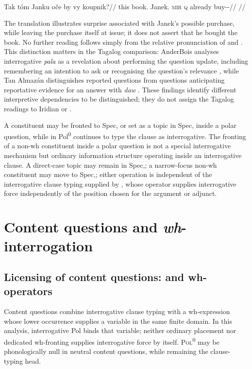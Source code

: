 \pex
\a
\begingl
\gla Tak tóm Janku oče by vy koupnik?//
\glb this book.\Dir{} Janek.\Trs{} \textsc{mir} \textsc{q} already buy-\Trs{}-\Pf{}//
\glft {}//
\endgl
\xe

The translation illustrates surprise associated with Janek's possible
purchase, while leaving the purchase itself at issue; it does not assert that
he bought the book. No further reading follows simply from the relative
pronunciation of  and . This distinction matters in the
Tagalog comparison: AnderBois analyses interrogative \textit{pala} as a
revelation about performing the question update, including remembering an
intention to ask or recognising the question's relevance
\cite[§5.2]{anderbois2023pala}, while Tan Almazán distinguishes reported
questions from questions anticipating reportative evidence for an answer
with \textit{daw} \cite[§4.3.4]{tanalmazan2019}. These findings identify
different interpretive dependencies to be distinguished; they do not assign
the Tagalog readings to Iridian  or .

A constituent may be fronted to Spec, or set as a topic in
Spec, inside a polar question, while  in
Pol\textsuperscript{0} continues to type the clause as interrogative. The
fronting of a non-wh constituent inside a polar question is not a special
interrogative mechanism but ordinary information structure operating inside an
interrogative clause. A direct-case topic may remain in Spec,; a
narrow-focus non-wh constituent may move to Spec,; either
operation is independent of the interrogative clause typing supplied by
, whose operator supplies interrogative force independently of the
position chosen for the argument or adjunct.


\section{Content questions and \textit{wh}-interrogation}
\label{sec:th-wh-interrogation}

\subsection{Licensing of content questions:  and wh-operators}
\label{sec:th-single-wh}

Content questions combine interrogative clause typing with a wh-expression
whose lower occurrence supplies a variable in the same finite domain. In this
analysis, interrogative Pol binds that variable; neither ordinary placement
nor dedicated wh-fronting supplies interrogative force by itself.
\textsc{Pol}\textsuperscript{0} may be phonologically null in neutral content
questions, while remaining the clause-typing head.

